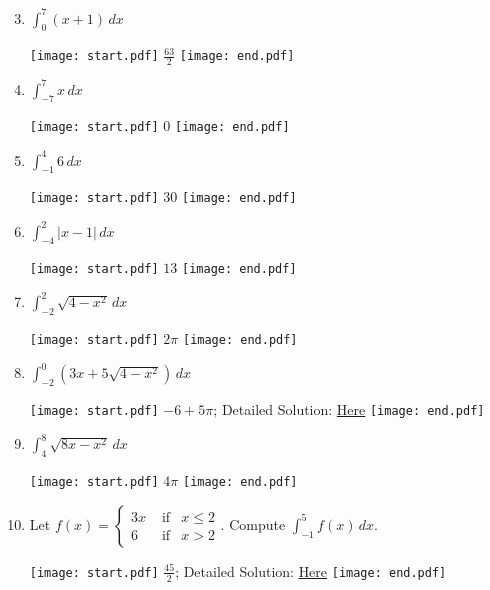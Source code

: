 \documentclass[12pt]{article}
\begin{document}

\begin{enumerate}
\setcounter{enumi}{2}

\item $\int_0^7{(x+1)}\,dx$

\texttt{[image: start.pdf]}
{{$\frac{63}{2}$}}
\texttt{[image: end.pdf]}


\item $\int_{-7}^7{x}\,dx$

\texttt{[image: start.pdf]}
{{$0$}}
\texttt{[image: end.pdf]}


\item $\int_{-1}^4{6}\,dx$

\texttt{[image: start.pdf]}
{{$30$}}
\texttt{[image: end.pdf]}


\item $\int_{-4}^{2}{|x-1|} \,dx$

\texttt{[image: start.pdf]}
{{$13$}}
\texttt{[image: end.pdf]}


\item $\int_{-2}^2{\sqrt{4-x^2}} \,dx$

\texttt{[image: start.pdf]}
{{$2\pi$}}
\texttt{[image: end.pdf]}


\item $\int_{-2}^0{\left(3x+5\sqrt{4-x^2}\right)} \,dx$

\texttt{[image: start.pdf]}
{{$-6+5\pi$; Detailed Solution: \textcolor{blue}{\href{http://www.math.drexel.edu/classes/Calculus/resources/Math122HW/Solutions/122_02_Definite_08.pdf}{Here}}}}
\texttt{[image: end.pdf]}


\item $\int_4^8{\sqrt{8x-x^2}} \,dx$

\texttt{[image: start.pdf]}
{{$4\pi$}}
\texttt{[image: end.pdf]}


\item Let $f(x)=\left\{\begin{array}{lll}
3x & \text{ if} & x \leq 2 \\
6 & \text{ if} & x>2
\end{array}\right.$.  Compute $\int_{-1}^5{f(x)} \,dx$.

\texttt{[image: start.pdf]}
{{$\frac{45}{2}$; Detailed Solution: \textcolor{blue}{\href{http://www.math.drexel.edu/classes/Calculus/resources/Math122HW/Solutions/122_02_Definite_10.pdf}{Here}}}}
\texttt{[image: end.pdf]}



\end{enumerate}
\end{document}
